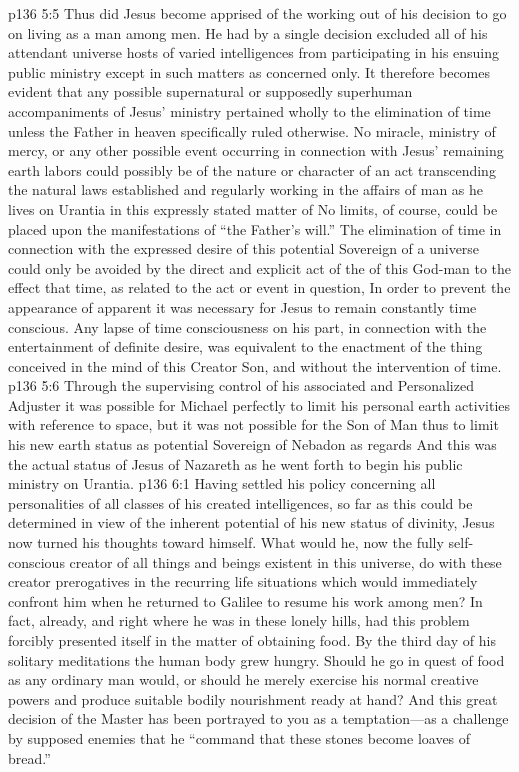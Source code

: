 \pc \vs p136 5:5 Thus did Jesus become apprised of the working out of his decision to go on living as a man among men. He had by a single decision excluded all of his attendant universe hosts of varied intelligences from participating in his ensuing public ministry except in such matters as concerned  only. It therefore becomes evident that any possible supernatural or supposedly superhuman accompaniments of Jesus’ ministry pertained wholly to the elimination of time unless the Father in heaven specifically ruled otherwise. No miracle, ministry of mercy, or any other possible event occurring in connection with Jesus’ remaining earth labors could possibly be of the nature or character of an act transcending the natural laws established and regularly working in the affairs of man as he lives on Urantia  in this expressly stated matter of  No limits, of course, could be placed upon the manifestations of “the Father’s will.” The elimination of time in connection with the expressed desire of this potential Sovereign of a universe could only be avoided by the direct and explicit act of the  of this God\hyp{}man to the effect that time, as related to the act or event in question,  In order to prevent the appearance of apparent  it was necessary for Jesus to remain constantly time conscious. Any lapse of time consciousness on his part, in connection with the entertainment of definite desire, was equivalent to the enactment of the thing conceived in the mind of this Creator Son, and without the intervention of time.
\vs p136 5:6 Through the supervising control of his associated and Personalized Adjuster it was possible for Michael perfectly to limit his personal earth activities with reference to space, but it was not possible for the Son of Man thus to limit his new earth status as potential Sovereign of Nebadon as regards  And this was the actual status of Jesus of Nazareth as he went forth to begin his public ministry on Urantia.
\vs p136 6:1 Having settled his policy concerning all personalities of all classes of his created intelligences, so far as this could be determined in view of the inherent potential of his new status of divinity, Jesus now turned his thoughts toward himself. What would he, now the fully self\hyp{}conscious creator of all things and beings existent in this universe, do with these creator prerogatives in the recurring life situations which would immediately confront him when he returned to Galilee to resume his work among men? In fact, already, and right where he was in these lonely hills, had this problem forcibly presented itself in the matter of obtaining food. By the third day of his solitary meditations the human body grew hungry. Should he go in quest of food as any ordinary man would, or should he merely exercise his normal creative powers and produce suitable bodily nourishment ready at hand? And this great decision of the Master has been portrayed to you as a temptation---as a challenge by supposed enemies that he “command that these stones become loaves of bread.”
